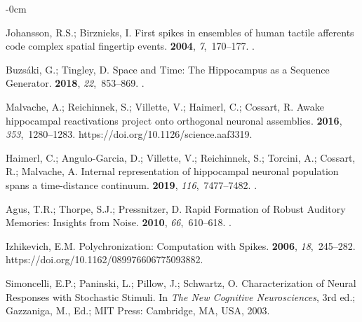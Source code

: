 \documentclass[brainsci, %
               review,accept,pdftex,moreauthors
               ]{Definitions/mdpi}
\begin{document}
\begin{adjustwidth}{-\extralength}{0cm}
\begin{thebibliography}{999}
Johansson, R.S.; Birznieks, I.
\newblock First spikes in ensembles of human tactile afferents code complex
  spatial fingertip events.
 {\bf 2004}, {\em 7},~170--177.
.

Buzsáki, G.; Tingley, D.
\newblock Space and {Time}: {The} {Hippocampus} as a {Sequence} {Generator}.
 {\bf 2018}, {\em 22},~853--869.
.

Malvache, A.; Reichinnek, S.; Villette, V.; Haimerl, C.; Cossart, R.
\newblock Awake hippocampal reactivations project onto orthogonal neuronal
  assemblies.
 {\bf 2016}, {\em 353},~1280--1283.
 {{https://doi.org/10.1126/science.aaf3319}}.

Haimerl, C.; Angulo-Garcia, D.; Villette, V.; Reichinnek, S.; Torcini, A.;
  Cossart, R.; Malvache, A.
\newblock Internal representation of hippocampal neuronal population spans a
  time-distance continuum.
 {\bf 2019},
  {\em 116},~7477--7482.
.

Agus, T.R.; Thorpe, S.J.; Pressnitzer, D.
\newblock Rapid {Formation} of {Robust} {Auditory} {Memories}: {Insights} from
  {Noise}.
 {\bf 2010}, {\em 66},~610--618.
.

Izhikevich, E.M.
\newblock Polychronization: {Computation} with {Spikes}.
 {\bf 2006}, {\em 18},~245--282.\linebreak
 {{https://doi.org/10.1162/089976606775093882}}.

Simoncelli, E.P.; Paninski, L.; Pillow, J.; Schwartz, O.
\newblock Characterization of {Neural} {Responses} with {Stochastic} {Stimuli}. In \emph{{The New Cognitive Neurosciences}}, {3rd ed.; Gazzaniga, M., Ed.; MIT Press: Cambridge, MA, USA,} %
  {2003}.


\end{thebibliography}
\end{adjustwidth}
\end{document}

